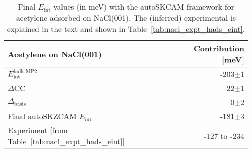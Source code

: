 \begin{table}[h]
\caption{\label{tab:nacl_eint}Final $E_\text{int}$ values (in meV) with the autoSKCAM framework for acetylene adsorbed on NaCl(001). The (inferred) experimental is explained in the text and shown in Table~\ref{tab:nacl_expt_hads_eint}.}
\begin{adjustbox}{center,max width=1\textwidth}
\begin{tabular}{lr}
\toprule
 Acetylene on NaCl(001) & Contribution [meV] \\ 
\midrule
$E_\text{int}^\text{bulk MP2}$ & -203$\pm$1 \\
$\Delta$CC & 22$\pm$1 \\
$\Delta_\text{basis}$ & 0$\pm$2 \\
Final autoSKZCAM $E_\text{int}$ & -181$\pm$3 \\
Experiment [from Table~\ref{tab:nacl_expt_hads_eint}] & -127 to -234 \\
\bottomrule
\end{tabular}
\end{adjustbox}
\end{table}